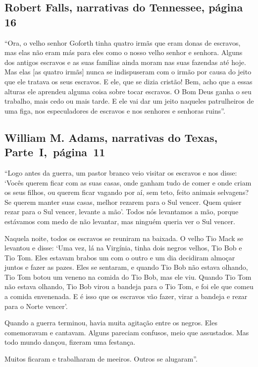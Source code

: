 \subsection{Robert Falls, narrativas do Tennessee, página 16} \label{ref88}

``Ora, o velho senhor Goforth tinha quatro irmãs que eram donas de
escravos, mas elas não eram más para eles como o nosso velho senhor e
senhora. Alguns dos antigos escravos e as suas famílias ainda moram nas
suas fazendas até hoje. Mas elas {[}as quatro irmãs{]} nunca se
indispuseram com o irmão por causa do jeito que ele tratava os seus
escravos. E ele, que se dizia cristão! Bem, acho que a essas alturas ele
aprendeu alguma coisa sobre tocar escravos. O Bom Deus ganha o seu
trabalho, mais cedo ou mais tarde. E ele vai dar um jeito naqueles
patrulheiros de uma figa, nos especuladores de escravos e nos senhores e
senhoras ruins''.

\subsection{William M. Adams, narrativas do Texas, Parte~I,~página~11} \label{ref04}

``Logo antes da guerra, um pastor branco veio visitar os escravos e nos
disse: `Vocês querem ficar com as suas casas, onde ganham tudo de comer
e onde criam os seus filhos, ou querem ficar vagando por aí, sem teto,
feito animais selvagens? Se querem manter suas casas, melhor rezarem
para o Sul vencer. Quem quiser rezar para o Sul vencer, levante a mão'.
Todos nós levantamos a mão, porque estávamos com medo de não levantar,
mas ninguém queria ver o Sul vencer.

Naquela noite, todos os escravos se reuniram na baixada. O velho Tio
Mack se levantou e disse: `Uma vez, lá na Virgínia, tinha dois negros
velhos, Tio Bob e Tio Tom. Eles estavam brabos um com o outro e um dia
decidiram almoçar juntos e fazer as pazes. Eles se sentaram, e quando
Tio Bob não estava olhando, Tio Tom botou um veneno na comida do Tio
Bob, mas ele viu. Quando Tio Tom não estava olhando, Tio Bob virou a
bandeja para o Tio Tom, e foi ele que comeu a comida envenenada. E é
isso que os escravos vão fazer, virar a bandeja e rezar para o Norte
vencer'.

Quando a guerra terminou, havia muita agitação entre os negros. Eles
comemoravam e cantavam. Alguns pareciam confusos, meio que assustados.
Mas todo mundo dançou, fizeram uma festança.

Muitos ficaram e trabalharam de meeiros. Outros se alugaram''.

